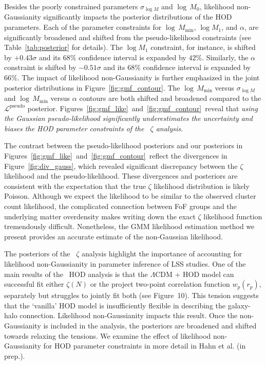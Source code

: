 \documentclass[12pt, letterpaper, preprint]{aastex}
\newcommand{\Sinh}{\citetalias{sinha2017}}
\begin{document}
Besides the poorly constrained parameters $\sigma_{\log M}$ and $\log\, M_0$, 
likelihood non-Gaussianity significantly impacts the posterior 
distributions of the HOD parameters. Each of the parameter constraints 
for $\log\,M_\mathrm{min}$, $\log M_1$, and $\alpha$, are significantly 
broadened and shifted from the pseudo-likelihood constraints
(see Table~\ref{tab:posterior} for details). The $\log M_1$ constraint, 
for instance, is shifted by $+0.43 \sigma$ and its $68\%$ confidence
interval is expanded by $42\%$. Similarly, the $\alpha$ constraint is
shifted by $-0.51 \sigma$ and its $68\%$ confidence interval is expanded 
by $66\%$. The impact of likelihood non-Gaussianity is further emphasized in 
the joint posterior distributions in Figure~\ref{fig:gmf_contour}.
The $\log\,M_\mathrm{min}$ versus $\sigma_{\log M}$ and 
$\log\,M_\mathrm{min}$ versus $\alpha$ contours are both shifted 
and broadened compared to the $\mathcal{L}^\mathrm{pseudo}$ 
posterior. Figures~\ref{fig:gmf_like}~and~\ref{fig:gmf_contour}~reveal 
that \emph{using the Gaussian pseudo-likelihood significantly 
underestimates the uncertainty and biases the HOD parameter constraints 
of the \Sinh~$\zeta$ analysis.}

The contrast between the pseudo-likelihood posteriors and our posteriors
in Figures~\ref{fig:gmf_like}~and~\ref{fig:gmf_contour}~reflect 
the divergences in Figure~\ref{fig:div_gauss}, which revealed significant
discrepancy between the $\zeta$ likelihood and the pseudo-likelihood. 
These divergences and posteriors are consistent with the expectation 
that the true $\zeta$ likelihood distribution is likely Poisson. Although 
we expect the likelihood to be similar to the observed cluster count likelihood, 
the complicated connection between FoF groups and the underlying 
matter overdensity makes writing down the exact $\zeta$ likelihood function 
tremendously difficult. Nonetheless, the GMM likelihood estimation method we 
present provides an accurate estimate of the non-Gaussian likelihood. 

The posteriors of the \Sinh~$\zeta$ analysis highlight the importance of 
accounting for likelihood non-Gaussianity in parameter inference of 
LSS studies. One of the main results of the \Sinh~HOD analysis 
is that the $\Lambda$CDM + HOD model can successful 
fit either $\zeta(N)$ or the project two-point correlation function 
$w_p(r_p)$, separately but struggles to jointly fit both (see Figure~10). 
This tension suggests that the `vanilla' HOD model is insufficiently 
flexible in describing the galaxy-halo connection. Likelihood non-Gaussianity
impacts this result. Once the non-Gaussianity is included in 
the analysis, the posteriors are broadened and shifted towards 
relaxing the tensions. We examine the effect of likelihood non-Gaussianity 
for HOD parameter constraints in more detail in Hahn et al. (in prep.). 
\end{document}
